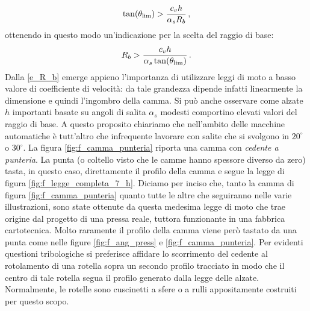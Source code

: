 \begin{equation}
\tan(\theta_{\rm lim})> {c_v h\over{\alpha_s R_b}}\,,
\label{e_ang_press_max}
\end{equation}
\noindent ottenendo in questo modo un'indicazione per la scelta del raggio di base:
\begin{equation}
R_b > {c_v h\over{\alpha_s \tan(\theta_{\rm lim})}}\,.
\label{e_R_b}
\end{equation}
\noindent Dalla \ref{e_R_b} emerge appieno l'importanza di utilizzare
leggi di moto a basso valore di coefficiente di velocit\`a: da tale
grandezza dipende infatti linearmente la dimensione e quindi l'ingombro della camma.
Si pu\`o anche osservare come alzate $h$ importanti
basate su angoli di salita $\alpha_s$ modesti comportino
elevati valori del raggio di base. A questo proposito chiariamo
che nell'ambito delle  macchine automatiche \`e tutt'altro che infrequente
lavorare con salite che si svolgono in $20^{\circ}$ o $30^{\circ}$. 
\noindent La figura \ref{fig:f_camma_punteria} riporta una camma con {\em cedente a
punteria}. La punta (o coltello visto che le camme hanno
spessore diverso da zero) tasta, in questo caso, direttamente il profilo della camma e segue
la legge di figura \ref{fig:f_legge_completa_7_h}.
Diciamo per inciso che, tanto la camma di figura \ref{fig:f_camma_punteria} quanto
tutte le altre che seguiranno nelle varie illustrazioni, sono state
ottenute da questa medesima legge di moto che trae origine dal progetto di una 
pressa reale, tuttora funzionante in una fabbrica cartotecnica.
\noindent Molto raramente il profilo della camma viene per\`o tastato 
da una punta come nelle figure \ref{fig:f_ang_press} e \ref{fig:f_camma_punteria}.
Per evidenti questioni tribologiche si preferisce affidare lo scorrimento
del cedente al rotolamento di una rotella sopra un secondo profilo
tracciato in modo che 
il centro di tale rotella segua 
il profilo generato dalla legge delle alzate.
Normalmente, le rotelle sono  cuscinetti a sfere o a rulli appositamente
costruiti per questo scopo.
\vskip 2mm
